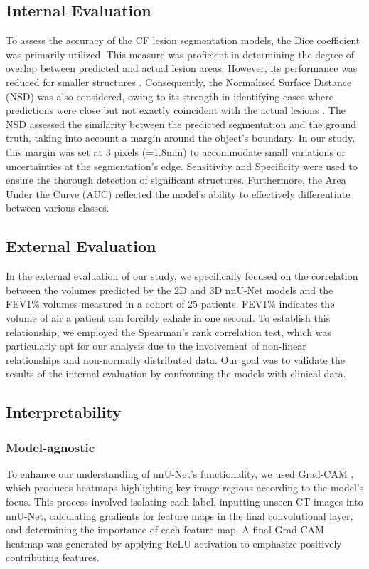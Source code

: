 \documentclass{article}
\begin{document}
\subsection{Internal Evaluation}
\label{sssec:interpret}
To assess the accuracy of the CF lesion segmentation models, the Dice coefficient was primarily utilized. This measure was proficient in determining the degree of overlap between predicted and actual lesion areas. However, its performance was reduced for smaller structures \cite{R11}. Consequently, the Normalized Surface Distance (NSD) was also considered, owing to its strength in identifying cases where predictions were close but not exactly coincident with the actual lesions \cite{R8}. The NSD assessed the similarity between the predicted segmentation and the ground truth, taking into account a margin around the object's boundary. In our study, this margin was set at 3 pixels (=1.8mm) to accommodate small variations or uncertainties at the segmentation's edge.
Sensitivity and Specificity were used to ensure the thorough detection of significant structures. Furthermore, the Area Under the Curve (AUC) reflected the model's ability to effectively differentiate between various classes.

\subsection{External Evaluation }
\label{sssec:interpret}
In the external evaluation of our study, we specifically focused on the correlation between the volumes predicted by the 2D and 3D nnU-Net models and the FEV1\% volumes measured in a cohort of 25 patients. FEV1\% indicates the volume of air a patient can forcibly exhale in one second.
To establish this relationship, we employed the Spearman's rank correlation test, which was particularly apt for our analysis due to the involvement of non-linear relationships and non-normally distributed data. Our goal was to validate the results of the internal evaluation by confronting the models with clinical data. 

\subsection{Interpretability}
\label{sssec:interpret}
\subsubsection{Model-agnostic}
To enhance our understanding of nnU-Net's functionality, we used Grad-CAM \cite{R12}, which produces heatmaps highlighting key image regions according to the model's focus. This process involved isolating each label, inputting unseen CT-images into nnU-Net, calculating gradients for feature maps in the final convolutional layer, and determining the importance of each feature map. A final Grad-CAM heatmap was generated by applying ReLU activation to emphasize positively contributing features.
\end{document}
